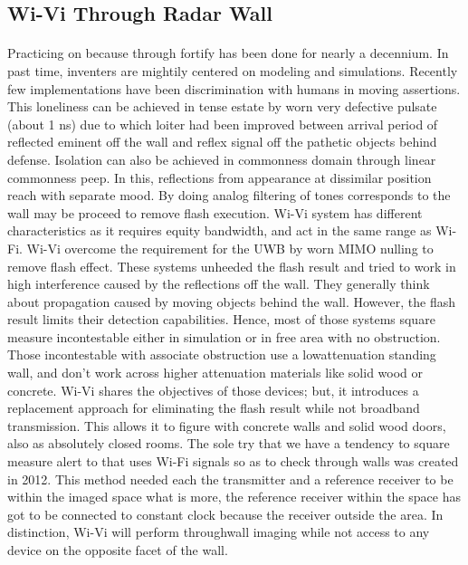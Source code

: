 \documentclass[a4paper,12pt,oneside]{article}
\begin{document}
\subsection{Wi-Vi Through Radar Wall}
\paragraph{}
Practicing on because through fortify has been done for nearly a decennium. In past time,
inventers are mightily centered on modeling and simulations. Recently few implementations
have been discrimination with humans in moving assertions. This loneliness can be achieved in
tense estate by worn very defective pulsate (about 1 ns) due to which loiter had been improved
between arrival period of reflected eminent off the wall and reflex signal off the pathetic objects
behind defense. Isolation can also be achieved in commonness domain through linear
commonness peep. In this, reflections from appearance at dissimilar position reach with separate
mood. By doing analog filtering of tones corresponds to the wall may be proceed to remove flash
execution. Wi-Vi system has different characteristics as it requires equity bandwidth, and act in
the same range as Wi-Fi. Wi-Vi overcome the requirement for the UWB by worn MIMO nulling
to remove flash effect. These systems unheeded the flash result and tried to work in high
interference caused by the reflections off the wall. They generally think about propagation
caused by moving objects behind the wall. However, the flash result limits their detection
capabilities. Hence, most of those systems square measure incontestable either in simulation or
in free area with no obstruction. Those incontestable with associate obstruction use a lowattenuation
standing wall, and don't work across higher attenuation materials like solid wood or
concrete. Wi-Vi shares the objectives of those devices; but, it introduces a replacement approach
for eliminating the flash result while not broadband transmission. This allows it to figure with
concrete walls and solid wood doors, also as absolutely closed rooms. The sole try that we have a
tendency to square measure alert to that uses Wi-Fi signals so as to check through walls was
created in 2012. This method needed each the transmitter and a reference receiver to be within
the imaged space what is more, the reference receiver within the space has got to be connected to
constant clock because the receiver outside the area. In distinction, Wi-Vi will perform throughwall
imaging while not access to any device on the opposite facet of the wall.
\end{document}
